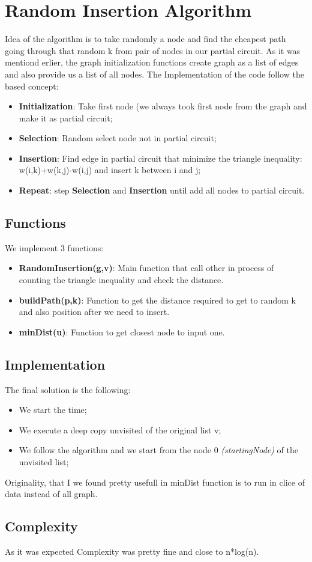 \section{Random Insertion Algorithm}\label{randominsertion}
Idea of the algorithm is to take randomly a node and find the cheapest path going through that random k from pair of nodes in our partial circuit. 
As it was mentiond erlier, the graph initialization functions create graph as a list of edges and also provide us a list of all nodes.
The Implementation of the code follow the based concept:

\begin{itemize}
    \item \textbf{Initialization}: Take first node (we always took first node from the graph and make it as partial circuit;
    \item \textbf{Selection}: Random select node not in partial circuit;
    \item \textbf{Insertion}: Find edge in partial circuit that minimize the triangle inequality: w(i,k)+w(k,j)-w(i,j) and insert k between i and j;
    \item \textbf{Repeat}: step \textbf{Selection} and \textbf{Insertion} until add all nodes to partial circuit.
\end{itemize}


\subsection{Functions}
We implement 3 functions: 

\begin{itemize}
	\item \textbf{RandomInsertion(g,v)}: Main function that call other in process of counting the triangle inequality and check the distance.
	\item \textbf{buildPath(p,k)}: Function to get the distance required to get to random k and also position after we need to insert. 
	\item \textbf{minDist(u)}: Function to get closest node to input one.
\end{itemize}

\subsection{Implementation}
The final solution is the following:
\begin{itemize}
	\item We start the time;
	\item We execute a deep copy unvisited of the original list v;
	\item We follow the algorithm and we start from the node 0 \textit{(startingNode)} of the unvisited list;
\end{itemize}

Originality, that I we found pretty usefull in minDist function is to run in clice of data instead of all graph.

\subsection{Complexity}

As it was expected Complexity was pretty fine and close to n*log(n).


\pagebreak